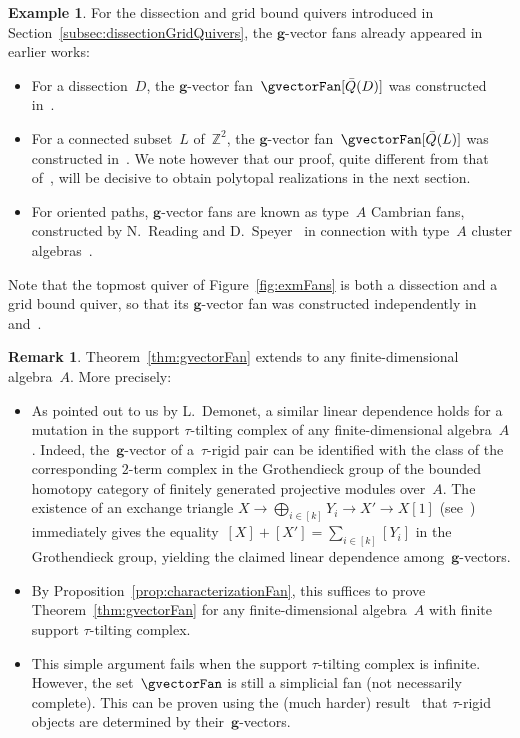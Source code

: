 \documentclass{amsart}
\theoremstyle{definition}
\newtheorem{example}[theorem]{Example}
\newtheorem{remark}[theorem]{Remark}
\newcommand{\Z}{\mathbb{Z}} %
\renewcommand{\b}[1]{\mathbf{#1}} %
\newcommand{\fref}[1]{Figure~\ref{#1}} %
\begin{document}
\begin{example}
For the dissection and grid bound quivers introduced in Section~\ref{subsec:dissectionGridQuivers}, the $\b{g}$-vector fans already appeared in earlier works:
\begin{itemize}
\item For a dissection~$D$, the $\b{g}$-vector fan~$\gvectorFan[\bar Q(D)]$ was constructed in~\cite{MannevillePilaud-accordion}.
\item For a connected subset~$L$ of~$\Z^2$, the $\b{g}$-vector fan~$\gvectorFan[\bar Q(L)]$ was constructed in~\cite{GarverMcConville-grid}. We note however that our proof, quite different from that of~\cite{GarverMcConville-grid}, will be decisive to obtain polytopal realizations in the next section.
\item For oriented paths, $\b{g}$-vector fans are known as type~$A$ Cambrian fans, constructed by N.~Reading and D.~Speyer~\cite{ReadingSpeyer} in connection with type~$A$ cluster algebras~\cite{FominZelevinsky-ClusterAlgebrasI, FominZelevinsky-ClusterAlgebrasII}.
\end{itemize}
Note that the topmost quiver of \fref{fig:exmFans} is both a dissection and a grid bound quiver, so that its $\b{g}$-vector fan was constructed independently in~\cite{MannevillePilaud-accordion} and~\cite{GarverMcConville-grid}.
\end{example}

\begin{remark}
\label{rem:linDep}
\enlargethispage{.1cm}
Theorem~\ref{thm:gvectorFan} extends to any finite-dimensional algebra~$A$. More precisely:
\begin{itemize}
\item As pointed out to us by L.~Demonet, a similar linear dependence holds for a mutation in the support $\tau$-tilting complex of any finite-dimensional algebra~$A$.
Indeed, the~$\b{g}$-vector of a~$\tau$-rigid pair can be identified with the class of the corresponding $2$-term complex in the Grothendieck group of the bounded homotopy category of finitely generated projective modules over~$A$.
The existence of an exchange triangle $X \rightarrow \bigoplus_{i \in [k]} Y_i \rightarrow X' \rightarrow X[1]$ (see~\cite{AiharaIyama}) immediately gives the equality~$[X] + [X'] = \sum_{i \in [k]} [Y_i]$ in the Grothendieck group, yielding the claimed linear dependence among~$\b{g}$-vectors.
\item By Proposition~\ref{prop:characterizationFan}, this suffices to prove Theorem~\ref{thm:gvectorFan} for any finite-dimensional algebra~$A$ with finite support $\tau$-tilting complex. 
\item This simple argument fails when the support $\tau$-tilting complex is infinite. However, the set~$\gvectorFan$ is still a simplicial fan (not necessarily complete). This can be proven using the (much harder) result~\cite{DehyKeller, DemonetIyamaJasso} that $\tau$-rigid objects are determined by their~$\b{g}$-vectors.
\end{itemize}
\end{remark}
\end{document}

